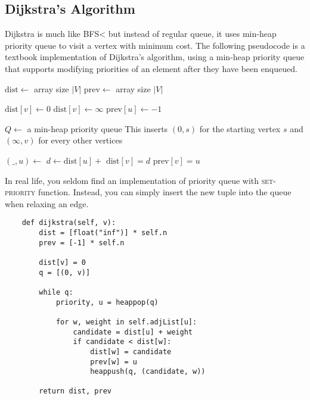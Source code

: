 \subsection{Dijkstra's Algorithm}

\noindent Dijkstra is much like BFS< but instead of regular queue, it uses min-heap priority queue to visit a vertex with minimum cost.
The following pseudocode is a textbook implementation of Dijkstra's algorithm, using a min-heap priority queue that supports modifying priorities of an element after they have been enqueued.

\noindent \hrulefill
\begin{algorithmic}[1]
   
    \State $\mathrm{dist} \gets$ array size $|V|$
    \State $\mathrm{prev} \gets$ array size $|V|$

        $\mathrm{dist}[v] \gets 0$
      \EndIf
        $\mathrm{dist}[v] \gets \infty$
      \EndIf
      \State $\mathrm{prev}[u] \gets -1$
    \EndFor
  \item[]
    \State $Q \gets$ a min-heap priority queue
      \LComment This inserts $(0, s)$ for the starting vertex $s$ and $(\infty, v)$ for every other vertices
      \State {}
    \EndFor
  \item[]
    \State $(\textrm{\_}, u) \gets$ 
      \State $d \gets \textrm{dist}[u] +$ 
        \State $\textrm{dist}[v] = d$
        \State $\textrm{prev}[v] = u$
        \State {}
      \EndIf
    \EndFor
    \EndWhile
  \EndFunction
\end{algorithmic}
\noindent \hrulefill

\noindent In real life, you seldom find an implementation of priority queue with \textsc{set-priority} function.
Instead, you can simply insert the new tuple into the queue when relaxing an edge.

\begin{verbatim}
    def dijkstra(self, v):
        dist = [float("inf")] * self.n
        prev = [-1] * self.n

        dist[v] = 0
        q = [(0, v)]

        while q:
            priority, u = heappop(q)

            for w, weight in self.adjList[u]:
                candidate = dist[u] + weight
                if candidate < dist[w]:
                    dist[w] = candidate
                    prev[w] = u
                    heappush(q, (candidate, w))

        return dist, prev
\end{verbatim}

